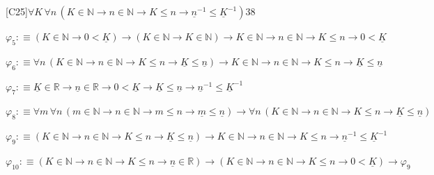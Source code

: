\begin{fullproof}{[C25]}{$\forall K\,\forall n\,(K \in \mathbb{N} \to n \in \mathbb{N} \to K \leq n \to \underline{n}^{-1} \leq \underline{K}^{-1})$}{38}
\begin{abbrevlist}
\item $\varphi_{5} :\equiv (K \in \mathbb{N} \to 0 < \underline{K}) \to (K \in \mathbb{N} \to K \in \mathbb{N}) \to K \in \mathbb{N} \to n \in \mathbb{N} \to K \leq n \to 0 < \underline{K}$
\item $\varphi_{6} :\equiv \forall n\,(K \in \mathbb{N} \to n \in \mathbb{N} \to K \leq n \to \underline{K} \leq \underline{n}) \to K \in \mathbb{N} \to n \in \mathbb{N} \to K \leq n \to \underline{K} \leq \underline{n}$
\item $\varphi_{7} :\equiv \underline{K} \in \mathbb{R} \to \underline{n} \in \mathbb{R} \to 0 < \underline{K} \to \underline{K} \leq \underline{n} \to \underline{n}^{-1} \leq \underline{K}^{-1}$
\item $\varphi_{8} :\equiv \forall m\,\forall n\,(m \in \mathbb{N} \to n \in \mathbb{N} \to m \leq n \to \underline{m} \leq \underline{n}) \to \forall n\,(K \in \mathbb{N} \to n \in \mathbb{N} \to K \leq n \to \underline{K} \leq \underline{n})$
\item $\varphi_{9} :\equiv (K \in \mathbb{N} \to n \in \mathbb{N} \to K \leq n \to \underline{K} \leq \underline{n}) \to K \in \mathbb{N} \to n \in \mathbb{N} \to K \leq n \to \underline{n}^{-1} \leq \underline{K}^{-1}$
\item $\varphi_{10} :\equiv (K \in \mathbb{N} \to n \in \mathbb{N} \to K \leq n \to \underline{n} \in \mathbb{R}) \to (K \in \mathbb{N} \to n \in \mathbb{N} \to K \leq n \to 0 < \underline{K}) \to \varphi_{9}$
\end{abbrevlist}
\end{fullproof}
